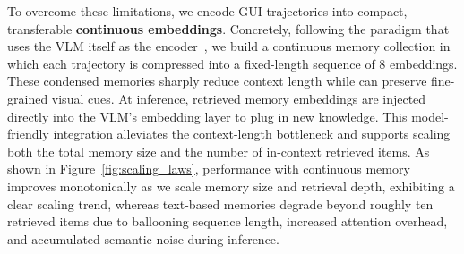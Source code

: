 \documentclass{article} %
\newcommand{\eg}{\emph{e.g.,}\xspace}
\begin{document}
To overcome these limitations, we encode GUI trajectories into compact, transferable \textbf{continuous embeddings}. Concretely, following the paradigm that uses the VLM itself as the encoder~\citep{wu2025}, we build a continuous memory collection in which each trajectory is compressed into a fixed-length sequence of 8 embeddings. These condensed memories sharply reduce context length while can preserve fine-grained visual cues. At inference, retrieved memory embeddings are injected directly into the VLM’s embedding layer to plug in new knowledge. This model-friendly integration alleviates the context-length bottleneck and supports scaling both the total memory size and the number of in-context retrieved items. As shown in Figure~\ref{fig:scaling_laws}, performance with continuous memory improves monotonically as we scale memory size and retrieval depth, exhibiting a clear scaling trend, whereas text-based memories degrade beyond roughly ten retrieved items due to ballooning sequence length, increased attention overhead, and accumulated semantic noise during inference.

\end{document}
